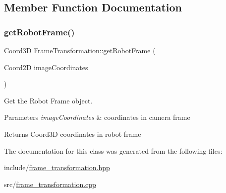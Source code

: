 \subsection{Member Function Documentation}
\mbox{\label{classFrameTransformation_ab5131e1392b2fb97c65014eec96d54a8}} 
\subsubsection{\texorpdfstring{get\+Robot\+Frame()}{getRobotFrame()}}
{\footnotesize\ttfamily Coord3D Frame\+Transformation\+::get\+Robot\+Frame (\begin{DoxyParamCaption}\item[{Coord2D}]{image\+Coordinates }\end{DoxyParamCaption})\hspace{0.3cm}{\ttfamily [virtual]}}



Get the Robot Frame object. 


\begin{DoxyParams}{Parameters}
{\em image\+Coordinates} & coordinates in camera frame \\
\hline
\end{DoxyParams}
\begin{DoxyReturn}{Returns}
Coord3D coordinates in robot frame 
\end{DoxyReturn}


The documentation for this class was generated from the following files\+:\begin{DoxyCompactItemize}
\item 
include/\hyperlink{frame__transformation_8hpp}{frame\+\_\+transformation.\+hpp}\item 
src/\hyperlink{frame__transformation_8cpp}{frame\+\_\+transformation.\+cpp}\end{DoxyCompactItemize}
